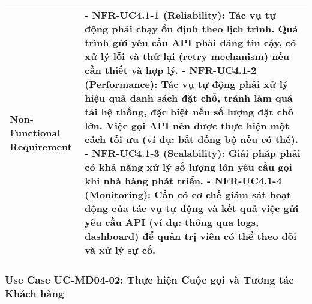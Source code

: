 \begin{longtable}{|m{4cm}|p{11cm}|}
Non-Functional Requirement & - \textbf{NFR-UC4.1-1 (Reliability):} Tác vụ tự động phải chạy ổn định theo lịch trình. Quá trình gửi yêu cầu API phải đáng tin cậy, có xử lý lỗi và thử lại (retry mechanism) nếu cần thiết và hợp lý. \newline - \textbf{NFR-UC4.1-2 (Performance):} Tác vụ tự động phải xử lý hiệu quả danh sách đặt chỗ, tránh làm quá tải hệ thống, đặc biệt nếu số lượng đặt chỗ lớn. Việc gọi API nên được thực hiện một cách tối ưu (ví dụ: bất đồng bộ nếu có thể). \newline - \textbf{NFR-UC4.1-3 (Scalability):} Giải pháp phải có khả năng xử lý số lượng lớn yêu cầu gọi khi nhà hàng phát triển. \newline - \textbf{NFR-UC4.1-4 (Monitoring):} Cần có cơ chế giám sát hoạt động của tác vụ tự động và kết quả việc gửi yêu cầu API (ví dụ: thông qua logs, dashboard) để quản trị viên có thể theo dõi và xử lý sự cố. \\
\hline
\end{longtable}

\subsubsection{Use Case UC-MD04-02: Thực hiện Cuộc gọi và Tương tác Khách hàng}

